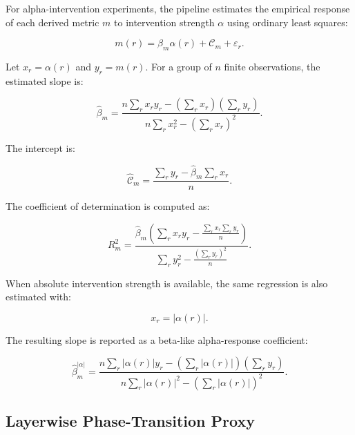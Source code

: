 For alpha-intervention experiments, the pipeline estimates the empirical response of each derived metric $m$ to intervention strength $\alpha$ using ordinary least squares:

\begin{equation}
m(r)
=
\beta_m \alpha(r)
+
\mathcal{C}_m
+
\varepsilon_r.
\end{equation}

Let $x_r = \alpha(r)$ and $y_r = m(r)$. 
For a group of $n$ finite observations, the estimated slope is:

\begin{equation}
\hat{\beta}_m
=
\frac{
n \sum_r x_r y_r
-
\left(
\sum_r x_r
\right)
\left(
\sum_r y_r
\right)
}{
n \sum_r x_r^2
-
\left(
\sum_r x_r
\right)^2
}.
\end{equation}

The intercept is:

\begin{equation}
\hat{\mathcal{C}}_m
=
\frac{
\sum_r y_r
-
\hat{\beta}_m
\sum_r x_r
}{
n
}.
\end{equation}

The coefficient of determination is computed as:

\begin{equation}
R_m^2
=
\frac{
\hat{\beta}_m
\left(
\sum_r x_r y_r
-
\frac{
\sum_r x_r \sum_r y_r
}{n}
\right)
}{
\sum_r y_r^2
-
\frac{
\left(
\sum_r y_r
\right)^2
}{n}
}.
\end{equation}

When absolute intervention strength is available, the same regression is also estimated with:

\begin{equation}
x_r = |\alpha(r)|.
\end{equation}

The resulting slope is reported as a beta-like alpha-response coefficient:

\begin{equation}
\hat{\beta}^{|\alpha|}_m
=
\frac{
n \sum_r |\alpha(r)| y_r
-
\left(
\sum_r |\alpha(r)|
\right)
\left(
\sum_r y_r
\right)
}{
n \sum_r |\alpha(r)|^2
-
\left(
\sum_r |\alpha(r)|
\right)^2
}.
\end{equation}

\subsection{Layerwise Phase-Transition Proxy}
\label{subsec:layerwise_transition}

